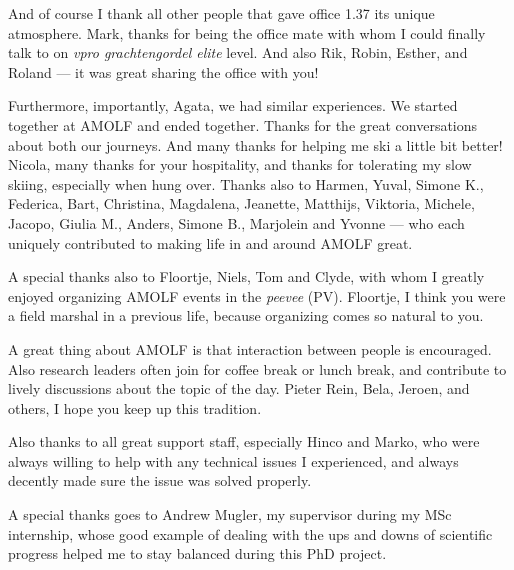
And of course I thank all other people that gave office 1.37 its unique atmosphere.
Mark, 
thanks for being the office mate with whom I could finally talk to on \textit{vpro grachtengordel elite} level.
And also Rik,
Robin, 
Esther, 
and Roland %
 --- it was great sharing the office with you!


Furthermore, importantly, 
Agata, we had similar experiences. We started together at AMOLF and ended together.
Thanks for the great conversations about both our journeys.
And many thanks for helping me ski a little bit better! 
%
Nicola, many thanks for your hospitality, 
and thanks for tolerating my slow skiing, especially when hung over.
%
Thanks also to
Harmen, 
Yuval, 
Simone K., 
Federica, 
Bart, 
Christina, 
Magdalena, 
Jeanette, 
Matthijs, 
Viktoria, 
Michele, 
Jacopo, 
Giulia M.,
Anders,
Simone B.,
Marjolein and
Yvonne --- who each uniquely contributed to making life in and around AMOLF great.


A special thanks also to
Floortje, Niels, Tom and Clyde,
with whom I greatly enjoyed organizing AMOLF events in the \textit{peevee} (PV).
%
Floortje, I think you were a field marshal in a previous life,
because organizing comes so natural to you.


A great thing about AMOLF is that interaction between people is encouraged. 
%
Also research leaders often join for coffee break or lunch break, and contribute to lively discussions about the topic of the day.
%
Pieter Rein, Bela, Jeroen, and others, I hope you keep up this tradition.


Also thanks to all great support staff,
especially Hinco and Marko, who were always willing to help with any technical issues I experienced, 
and always decently made sure the issue was solved properly.




A special thanks goes to Andrew Mugler, my supervisor during my MSc internship, 
whose good example of dealing with the ups and downs of scientific progress 
helped me to stay balanced during this PhD project.
%

